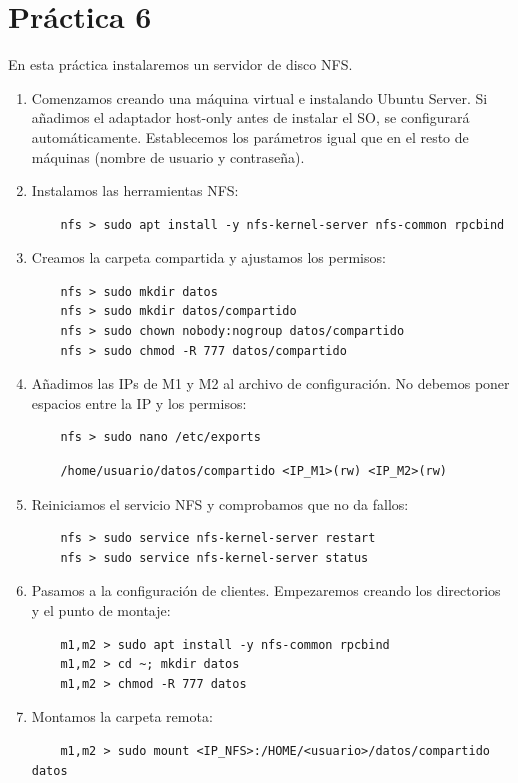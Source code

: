 \documentclass[12pt,spanish]{article}
\begin{document}
\section{Práctica 6}
En esta práctica instalaremos un servidor de disco NFS.
\begin{enumerate}
	\item Comenzamos creando una máquina virtual e instalando Ubuntu Server. Si añadimos el adaptador host-only antes de instalar el SO, se configurará automáticamente.
	Establecemos los parámetros igual que en el resto de máquinas (nombre de usuario y contraseña).
	\item Instalamos las herramientas NFS:
	\begin{lstlisting}
	nfs > sudo apt install -y nfs-kernel-server nfs-common rpcbind
	\end{lstlisting}
	\item Creamos la carpeta compartida y ajustamos los permisos:
	\begin{lstlisting}
	nfs > sudo mkdir datos
	nfs > sudo mkdir datos/compartido
	nfs > sudo chown nobody:nogroup datos/compartido
	nfs > sudo chmod -R 777 datos/compartido
	\end{lstlisting}
	\item Añadimos las IPs de M1 y M2 al archivo de configuración. No debemos poner espacios entre la IP y los permisos:
	\begin{lstlisting}
	nfs > sudo nano /etc/exports
	\end{lstlisting}
	\begin{lstlisting}
	/home/usuario/datos/compartido <IP_M1>(rw) <IP_M2>(rw)
	\end{lstlisting}
	\item Reiniciamos el servicio NFS y comprobamos que no da fallos:
	\begin{lstlisting}
	nfs > sudo service nfs-kernel-server restart
	nfs > sudo service nfs-kernel-server status
	\end{lstlisting}
	\item Pasamos a la configuración de clientes. Empezaremos creando los directorios y el punto de montaje:
	\begin{lstlisting}
	m1,m2 > sudo apt install -y nfs-common rpcbind
	m1,m2 > cd ~; mkdir datos
	m1,m2 > chmod -R 777 datos
	\end{lstlisting}
	\item Montamos la carpeta remota:
	\begin{lstlisting}
	m1,m2 > sudo mount <IP_NFS>:/HOME/<usuario>/datos/compartido datos
	\end{lstlisting}

\end{enumerate}
\end{document}

